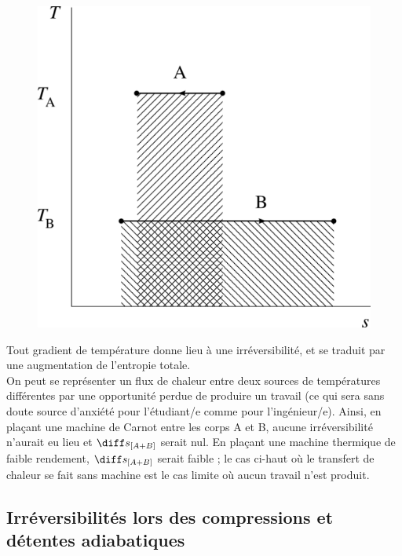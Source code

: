 		\begin{figure}
			\begin{center}
				\includegraphics[width=\didacticpvdiagramwidth]{images/ts_echange_chaleur.png}
			\end{center}
			\label{fig_expérience_création_entropie_t-s}
		\end{figure}

		Tout gradient de température donne lieu à une irréversibilité, et se traduit par une augmentation de l’entropie totale. \\
		On peut se représenter un flux de chaleur entre deux sources de températures différentes par une opportunité perdue de produire un travail (ce qui sera sans doute source d’anxiété pour l’étudiant/e comme pour l’ingénieur/e). Ainsi, en plaçant une machine de Carnot entre les corps A et B, aucune irréversibilité n’aurait eu lieu et $\diff s_{[A+B]}$ serait nul. En plaçant une machine thermique de faible rendement, $\diff s_{[A+B]}$ serait faible ; le cas ci-haut où le transfert de chaleur se fait sans machine est le cas limite où aucun travail n’est produit.

	\subsection{Irréversibilités lors des compressions et détentes adiabatiques}

